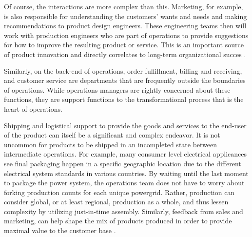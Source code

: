 Of course, the interactions are more complex than this. Marketing, for example, is also responsible for understanding the customers' wants and needs and making recommendations to product design engineers. These engineering teams then will work with production engineers who are part of operations to provide suggestions for how to improve the resulting product or service. This is an important source of product innovation and directly correlates to long-term organizational succes \parencite{dattomaDeterminantsTechnologicalInnovation2020}.

Similarly, on the back-end of operations, order fulfillment, billing and receiving, and customer service are departments that are frequently outside the boundaries of operations. While operations managers are rightly concerned about these functions, they are support functions to the transformational process that is the heart of operations.

Shipping and logistical support to provide the goods and services to the end-user of the product can itself be a significant and complex endeavor. It is not uncommon for products to be shipped in an incompleted state between intermediate operations. For example, many consumer level electrical applicances see final packaging happen in a specific geographic location due to the different electrical system standards in various countries. By waiting until the last moment to package the power system, the operations team does not have to worry about forking production counts for each unique powergrid. Rather, production can consider global, or at least regional, production as a whole, and thus lessen complexity by utilizing just-in-time assembly. Similarly, feedback from sales and marketing, can help shape the mix of products produced in order to provide maximal value to the customer base \parencite{tavakkoli-moghaddamMemeticAlgorithmMulticriteria2006}.
